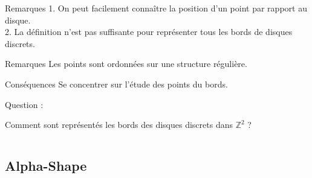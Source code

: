 \begin{frame}
\begin{columns}[t]
\begin{column}{5cm}
        {
          \begin{block}{Remarques}
            1. On peut facilement connaître la position d'un point par rapport au disque.\\
            2. La définition n'est pas suffisante pour représenter tous les bords de disques discrets.
          \end{block}
        }
        {
          \begin{block}{Remarques}
            Les points sont ordonnées sur une structure régulière.
          \end{block}
        }
        {
          \begin{block}{Conséquences}
            Se concentrer sur l'étude des points du bords.
          \end{block}
        }
        {
          \begin{block}{Question :}
            \begin{center}  
              \alert{Comment sont représentés les bords des disques discrets dans $\mathbb{Z}^{2}$ ?}
            \end{center}
          \end{block}
        }
      \end{column}
    \end{columns}
\end{frame}

\subsection{Alpha-Shape}

